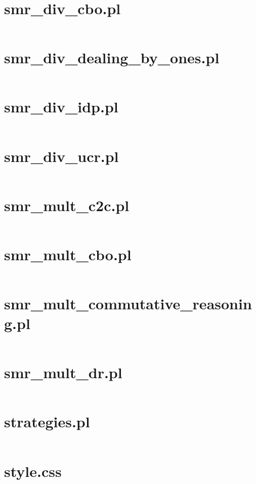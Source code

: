 \documentclass{article}
\begin{document}
\section{smr\_div\_cbo.pl}
\inputminted{prolog}{smr_div_cbo.pl}

\section{smr\_div\_dealing\_by\_ones.pl}
\inputminted{prolog}{smr_div_dealing_by_ones.pl}

\section{smr\_div\_idp.pl}
\inputminted{prolog}{smr_div_idp.pl}

\section{smr\_div\_ucr.pl}
\inputminted{prolog}{smr_div_ucr.pl}

\section{smr\_mult\_c2c.pl}
\inputminted{prolog}{smr_mult_c2c.pl}

\section{smr\_mult\_cbo.pl}
\inputminted{prolog}{smr_mult_cbo.pl}

\section{smr\_mult\_commutative\_reasoning.pl}
\inputminted{prolog}{smr_mult_commutative_reasoning.pl}

\section{smr\_mult\_dr.pl}
\inputminted{prolog}{smr_mult_dr.pl}

\section{strategies.pl}
\inputminted{prolog}{strategies.pl}

\section{style.css}
\inputminted{css}{style.css}
\end{document}
